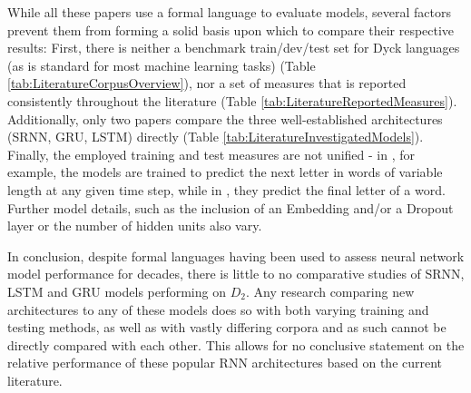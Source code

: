 While all these papers use a formal language to evaluate models, several factors prevent them from forming a solid basis upon which to compare their respective results:
First, there is neither a benchmark train/dev/test set for Dyck languages (as is standard for most machine learning tasks) (Table \ref{tab:LiteratureCorpusOverview}), nor a set of measures that is reported consistently throughout the literature (Table \ref{tab:LiteratureReportedMeasures}). Additionally, only two papers compare the three well-established architectures (SRNN, GRU, LSTM) directly (Table \ref{tab:LiteratureInvestigatedModels}).
Finally, the employed training and test measures are not unified - in \cite{Bernardy2018}, for example, the models are trained to predict the next letter in words of variable length at any given time step, while in \cite{Suzgun2019}, they predict the final letter of a word. Further model details, such as the inclusion of an Embedding and/or a Dropout layer or the number of hidden units also vary.

In conclusion, despite formal languages having been used to assess neural network model performance for decades, there is little to no comparative studies of SRNN, LSTM and GRU models performing on $D_{2}$. Any research comparing new architectures to any of these models does so with both varying training and testing methods, as well as with vastly differing corpora and as such cannot be directly compared with each other. This allows for no conclusive statement on the relative performance of these popular RNN architectures based on the current literature.
